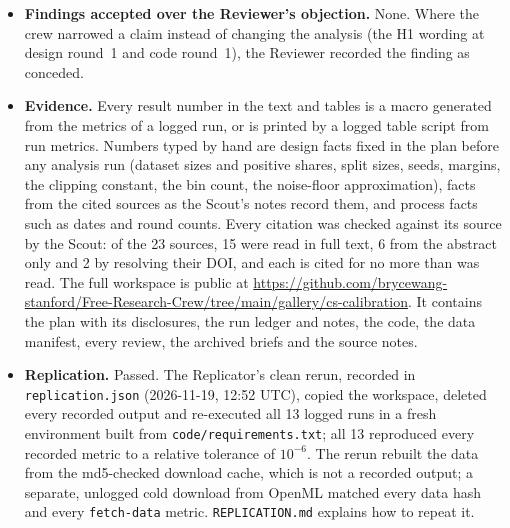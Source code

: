 \begin{itemize}
        starting analysis, no open critical finding, was met.
  \item \textbf{Findings accepted over the Reviewer's objection.} None. Where the crew
        narrowed a claim instead of changing the analysis (the H1 wording at design round~1
        and code round~1), the Reviewer recorded the finding as conceded.
  \item \textbf{Evidence.} Every result number in the text and tables is a macro generated
        from the metrics of a logged run, or is printed by a logged table script from run
        metrics. Numbers typed by hand are design facts fixed in the plan before any
        analysis run (dataset sizes and positive shares, split sizes, seeds, margins, the
        clipping constant, the bin count, the noise-floor approximation), facts from the
        cited sources as the Scout's notes record them, and process facts such as dates and
        round counts. Every citation was checked against its source by the Scout: of the 23
        sources, 15 were read in full text, 6 from the abstract only and 2 by resolving their
        DOI, and each is cited for no more than was read. The full workspace is public at
        \url{https://github.com/brycewang-stanford/Free-Research-Crew/tree/main/gallery/cs-calibration}.
        It contains the plan with its disclosures, the run ledger and notes, the code, the
        data manifest, every review, the archived briefs and the source notes.
  \item \textbf{Replication.} Passed. The Replicator's clean rerun, recorded in
        \texttt{replication.json} (2026-11-19, 12:52 UTC), copied the workspace, deleted every
        recorded output and re-executed all 13 logged runs in a fresh environment built from
        \texttt{code/requirements.txt}; all 13 reproduced every recorded metric to a relative
        tolerance of $10^{-6}$. The rerun rebuilt the data from the md5-checked download cache,
        which is not a recorded output; a separate, unlogged cold download from OpenML matched
        every data hash and every \texttt{fetch-data} metric.
        \texttt{REPLICATION.md} explains how to repeat it.
\end{itemize}
